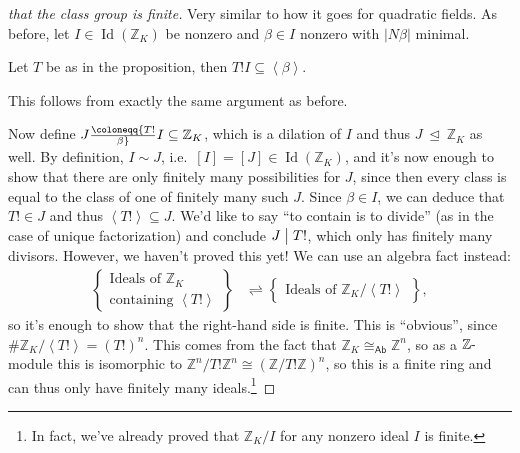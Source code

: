 \begin{proof}[that the class group is finite]

Very similar to how it goes for quadratic fields. As before, let
\(I \in \operatorname{Id}({\mathbb{Z}}_K)\) be nonzero and
\(\beta \in I\) nonzero with \({\left\lvert {N \beta} \right\rvert}\)
minimal.

\hfill\break

\begin{claim}

Let \(T\) be as in the proposition, then
\(T! I \subseteq \left\langle{ \beta }\right\rangle\).

\end{claim}

This follows from exactly the same argument as before.

\hfill\break

Now define \(J \coloneqq{T! \over \beta} I \subseteq {\mathbb{Z}}_K\),
which is a dilation of \(I\) and thus
\(J {~\trianglelefteq~}{\mathbb{Z}}_K\) as well. By definition,
\(I\sim J\), i.e.~\([I] = [J] \in \operatorname{Id}({\mathbb{Z}}_K)\),
and it's now enough to show that there are only finitely many
possibilities for \(J\), since then every class is equal to the class of
one of finitely many such \(J\). Since \(\beta\in I\), we can deduce
that \(T! \in J\) and thus
\(\left\langle{ T! }\right\rangle \subseteq J\). We'd like to say ``to
contain is to divide'' (as in the case of unique factorization) and
conclude \(J\bigm|T!\), which only has finitely many divisors. However,
we haven't proved this yet! We can use an algebra fact instead:
\begin{align*}
\left\{{\substack{
  \text{Ideals of ${\mathbb{Z}}_K$ }
  \\
  \text{containing } \left\langle{ T! }\right\rangle 
}}\right\}
&\rightleftharpoons
\left\{{\substack{
  \text{Ideals of } {\mathbb{Z}}_K / \left\langle{ T! }\right\rangle 
}}\right\}
,\end{align*}
so it's enough to show that the right-hand side is finite. This is
``obvious'', since
\(\# {\mathbb{Z}}_K / \left\langle{ T! }\right\rangle = (T!)^n\). This
comes from the fact that
\({\mathbb{Z}}_K \cong_{{\mathsf{Ab}}} {\mathbb{Z}}^n\), so as a
\({\mathbb{Z}}{\hbox{-}}\)module this is isomorphic to
\({\mathbb{Z}}^n / T! {\mathbb{Z}}^n \cong ({\mathbb{Z}}/T! {\mathbb{Z}})^n\),
so this is a finite ring and can thus only have finitely many
ideals.\footnote{In fact, we've already proved that
  \({\mathbb{Z}}_K / I\) for any nonzero ideal \(I\) is finite.}

\end{proof}

